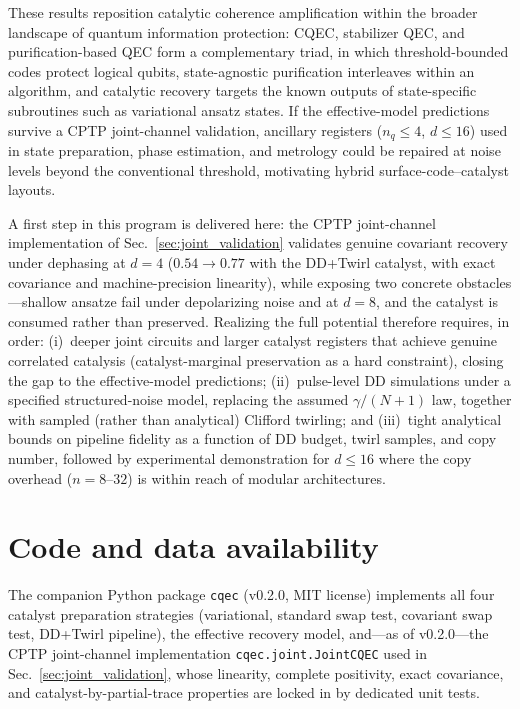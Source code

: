 \documentclass[a4paper,twocolumn]{quantumarticle}
\begin{document}
These results reposition catalytic coherence amplification within the broader landscape of quantum information protection: CQEC, stabilizer QEC, and purification-based QEC form a complementary triad, in which threshold-bounded codes protect logical qubits, state-agnostic purification interleaves within an algorithm, and catalytic recovery targets the known outputs of state-specific subroutines such as variational ansatz states.
If the effective-model predictions survive a CPTP joint-channel validation, ancillary registers ($n_q \leq 4$, $d \leq 16$) used in state preparation, phase estimation, and metrology could be repaired at noise levels beyond the conventional threshold, motivating hybrid surface-code--catalyst layouts.

A first step in this program is delivered here: the CPTP joint-channel implementation of Sec.~\ref{sec:joint_validation} validates genuine covariant recovery under dephasing at $d = 4$ ($0.54 \to 0.77$ with the DD+Twirl catalyst, with exact covariance and machine-precision linearity), while exposing two concrete obstacles---shallow ansatze fail under depolarizing noise and at $d = 8$, and the catalyst is consumed rather than preserved.
Realizing the full potential therefore requires, in order: (i)~deeper joint circuits and larger catalyst registers that achieve genuine correlated catalysis (catalyst-marginal preservation as a hard constraint), closing the gap to the effective-model predictions; (ii)~pulse-level DD simulations under a specified structured-noise model, replacing the assumed $\gamma/(N+1)$ law, together with sampled (rather than analytical) Clifford twirling; and (iii)~tight analytical bounds on pipeline fidelity as a function of DD budget, twirl samples, and copy number, followed by experimental demonstration for $d \leq 16$ where the copy overhead ($n = 8$--$32$) is within reach of modular architectures.


\section*{Code and data availability}
\label{sec:code_availability}

The companion Python package \texttt{cqec} (v0.2.0, MIT license) implements all four catalyst preparation strategies (variational, standard swap test, covariant swap test, DD+Twirl pipeline), the effective recovery model, and---as of v0.2.0---the CPTP joint-channel implementation \texttt{cqec.joint.JointCQEC} used in Sec.~\ref{sec:joint_validation}, whose linearity, complete positivity, exact covariance, and catalyst-by-partial-trace properties are locked in by dedicated unit tests.
\end{document}
